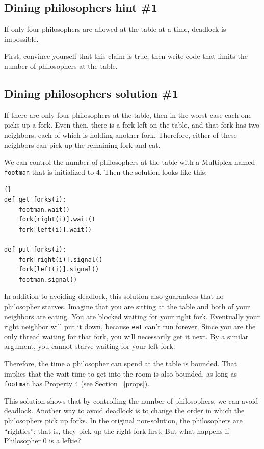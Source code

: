 \documentclass{book}
\begin{document}
\subsection{Dining philosophers hint \#1}

If only four philosophers are allowed at the table at a time,
deadlock is impossible.

First, convince yourself that this claim is true, then write code that
limits the number of philosophers at the table.



\subsection{Dining philosophers solution \#1}

If there are only four philosophers at the table, then in the
worst case each one picks up a fork.  Even then, there is a fork
left on the table, and that fork has two neighbors, each of
which is holding another fork.  Therefore, either of these
neighbors can pick up the remaining fork and eat.

We can control the number of philosophers at the table with
a Multiplex named {\tt footman} that is initialized to 4.
Then the solution looks like this:

\newpage
\begin{lstlisting}[title={Dining philosophers solution \#1}]{}
def get_forks(i):
    footman.wait()
    fork[right(i)].wait()
    fork[left(i)].wait()

def put_forks(i):
    fork[right(i)].signal()
    fork[left(i)].signal()
    footman.signal()
\end{lstlisting}

In addition to avoiding deadlock, this solution also guarantees that
no philosopher starves.
Imagine that you
are sitting at the table and both of your neighbors are eating.  You
are blocked waiting for your right fork.  Eventually your right
neighbor will put it down, because {\tt eat} can't run forever.  Since
you are the only thread waiting for that fork, you will necessarily
get it next.  By a similar argument, you cannot starve waiting for
your left fork.

Therefore, the time a philosopher can spend at the table is bounded.
That implies that the wait time to get into the room is also bounded,
as long as {\tt footman} has Property 4 (see Section ~\ref{props}).

This solution shows that
by controlling the number of philosophers, we can avoid deadlock.
Another way to avoid deadlock is to change the order in which the
philosophers pick up forks.  In the original non-solution, the
philosophers are ``righties''; that is, they pick up the right fork
first.  But what happens if Philosopher 0 is a leftie?
\end{document}
